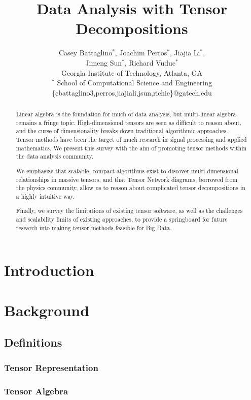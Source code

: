 \documentclass[10pt]{article}
\title{Data Analysis with Tensor Decompositions}
\author{
  Casey Battaglino$^\ast$, Joachim Perros$^\ast$, Jiajia Li$^\ast$, \\
   Jimeng Sun$^\ast$, Richard Vuduc$^\ast$
  \\ Georgia Institute of Technology, Atlanta, GA
  \\ $^\ast$ School of Computational Science and Engineering \\
  \{cbattaglino3,perros,jiajiali,jsun,richie\}@gatech.edu } \date{}
\begin{document}

\maketitle

\begin{abstract}
Linear algebra is the foundation for much of data analysis, but multi-linear algebra remains a fringe topic. High-dimensional tensors are seen as difficult to reason about, and the curse of dimensionality breaks down traditional algorithmic approaches. Tensor methods have been the target of much research in signal processing and applied mathematics. We present this survey with the aim of promoting tensor methods within the data analysis community.

We emphasize that scalable, compact algorithms exist to discover multi-dimensional relationships in massive tensors, and that Tensor Network diagrams, borrowed from the physics community, allow us to reason about complicated tensor decompositions in a highly intuitive way.

Finally, we survey the limitations of existing tensor software, as well as the challenges and scalability limits of existing approaches, to provide a springboard for future research into making tensor methods feasible for Big Data.
\end{abstract}

\tableofcontents
\section{Introduction} \label{sec:intro}

\section{Background} \label{sec:background}
\subsection{Definitions} \label{sec:definitions}
\subsubsection{Tensor Representation}
\subsubsection{Tensor Algebra}
\end{document}
